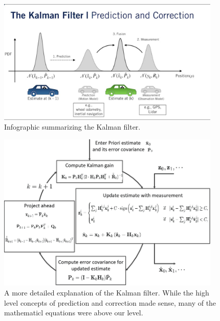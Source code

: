 \begin{figure}[htp]
\centering
\includegraphics[width=0.95\textwidth, angle=0]{Meetings/April/04-07-22/04-07-22 1.JPG}
\caption{Infographic summarizing the Kalman filter.}
\label{fig:040722_1}
\end{figure}

\begin{figure}[htp]
\centering
\includegraphics[width=0.95\textwidth, angle=0]{Meetings/April/04-07-22/04-07-22 2.png}
\caption{A more detailed explanation of the Kalman filter. While the high level concepts of prediction and correction made sense, many of the mathematicl equations were above our level.}
\label{fig:040722_2}
\end{figure}

